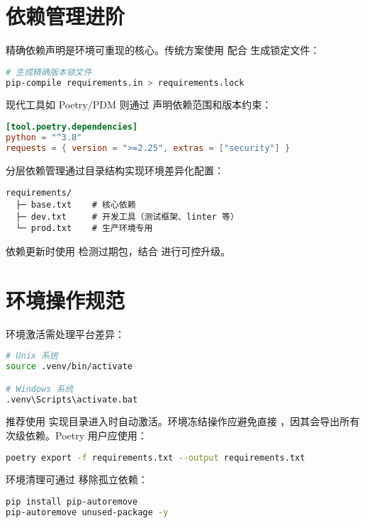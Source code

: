 \section{依赖管理进阶}
精确依赖声明是环境可重现的核心。传统方案使用  配合  生成锁定文件：\par
\begin{lstlisting}[language=bash]
# 生成精确版本锁文件
pip-compile requirements.in > requirements.lock
\end{lstlisting}
现代工具如 Poetry/PDM 则通过  声明依赖范围和版本约束：\par
\begin{lstlisting}[language=toml]
[tool.poetry.dependencies]
python = "^3.8"
requests = { version = ">=2.25", extras = ["security"] }
\end{lstlisting}
分层依赖管理通过目录结构实现环境差异化配置：\par
\begin{lstlisting}
requirements/
  ├─ base.txt    # 核心依赖
  ├─ dev.txt     # 开发工具（测试框架、linter 等）
  └─ prod.txt    # 生产环境专用
\end{lstlisting}
依赖更新时使用  检测过期包，结合  进行可控升级。\par
\section{环境操作规范}
环境激活需处理平台差异：\par
\begin{lstlisting}[language=bash]
# Unix 系统
source .venv/bin/activate  

# Windows 系统
.venv\Scripts\activate.bat
\end{lstlisting}
推荐使用  实现目录进入时自动激活。环境冻结操作应避免直接 ，因其会导出所有次级依赖。Poetry 用户应使用：\par
\begin{lstlisting}[language=bash]
poetry export -f requirements.txt --output requirements.txt
\end{lstlisting}
环境清理可通过  移除孤立依赖：\par
\begin{lstlisting}[language=bash]
pip install pip-autoremove
pip-autoremove unused-package -y
\end{lstlisting}
